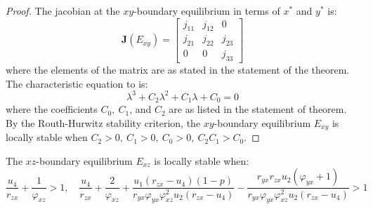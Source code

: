\begin{proof}
    The jacobian at the $xy$-boundary equilibrium in terms of $x^*$ and $y^*$ is:
    \begin{equation}\label{matrix:jacobian-boundary-xy}
        \textbf{J}\left(E_{xy}\right) = \begin{bmatrix}
            j_{11} & j_{12} & 0\\
            j_{21} & j_{22} & j_{23}\\
            0 & 0 & j_{33}
        \end{bmatrix}
    \end{equation}
    where the elements of the matrix are as stated in the statement of the theorem.
    The characteristic equation to  is:
    \begin{equation*}\label{eq:char-eq-xy}
        \lambda^3+C_2\lambda^2+C_1\lambda+C_0=0
    \end{equation*}
    where the coefficients $C_0,\ C_1$, and $C_2$ are as listed in the statement of theorem.
    By the Routh-Hurwitz stability criterion, the $xy$-boundary equilibrium $E_{xy}$ is locally stable when $C_2>0,\ C_1>0,\ C_0>0,\ C_2C_1>C_0$.
\end{proof}
\begin{theorem}\label{thm:boundary-xz-stability}
    The $xz$-boundary equilibrium $E_{xz}$ is locally stable when:
    \begin{equation*}
        \frac{u_4}{r_{zx}}+\frac{1}{\varphi_{xz}} > 1,\quad
        \frac{u_4}{r_{zx}}+\frac{2}{\varphi_{xz}}+\frac{u_1\left(r_{zx}-u_4\right)\left(1-p\right)}{r_{yx}\varphi_{yx}\varphi_{xz}^2u_2\left(r_{zx}-u_4\right)}-\frac{r_{yx}r_{zx}u_2\left(\varphi_{yx}+1\right)}{r_{yx}\varphi_{yx}\varphi_{xz}^2u_2\left(r_{zx}-u_4\right)} > 1
    \end{equation*}
\end{theorem}
